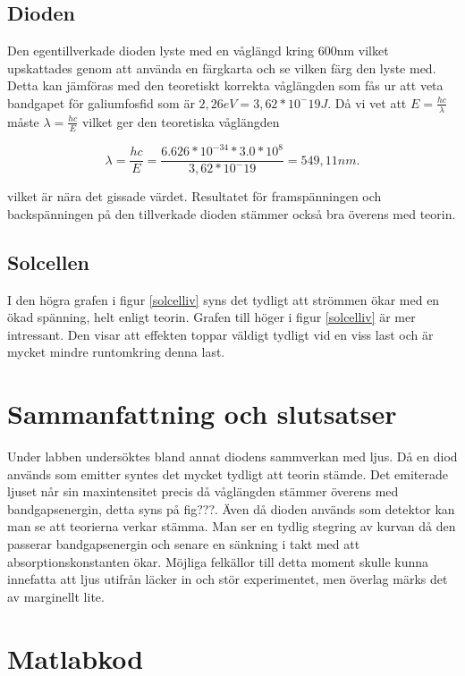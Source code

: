 \documentclass[a4paper]{article}
\begin{document}
\subsection{Dioden}
Den egentillverkade dioden lyste med en våglängd kring 600nm vilket upskattades genom att använda en färgkarta och se vilken färg den lyste med. Detta kan jämföras med den teoretiskt korrekta våglängden som fås ur att veta bandgapet för galiumfosfid som är $2,26eV = 3,62*10^-19J$. Då vi vet att $E = \frac{hc}{\lambda}$ måste $\lambda = \frac{hc}{E}$ vilket ger den teoretiska våglängden

\begin{equation}
	\lambda = \frac{hc}{E} = \frac{6.626*10^{-34} * 3.0*10^8}{3,62*10^-19} = 549,11 nm.
\end{equation}

vilket är nära det gissade värdet. Resultatet för framspänningen och backspänningen på den tillverkade dioden stämmer också bra överens med teorin.

\subsection{Solcellen}
I den högra grafen i figur \ref{solcelliv} syns det tydligt att strömmen ökar med en ökad spänning, helt enligt teorin. Grafen till höger i figur \ref{solcelliv} är mer intressant. Den visar att effekten toppar väldigt tydligt vid en viss last och är mycket mindre runtomkring denna last.


\section{Sammanfattning och slutsatser}
Under labben undersöktes bland annat diodens sammverkan med ljus. Då en diod används som emitter syntes det mycket tydligt att teorin stämde. Det emiterade ljuset når sin maxintensitet precis då våglängden stämmer överens med bandgapsenergin, detta syns på fig???. Även då dioden används som detektor kan man se att teorierna verkar stämma. Man ser en tydlig stegring av kurvan då den passerar bandgapsenergin och senare en sänkning i takt med att absorptionskonstanten ökar. Möjliga felkällor till detta moment skulle kunna innefatta att ljus utifrån läcker in och stör experimentet, men överlag märks det av marginellt lite. 

\newpage
\appendix
\section{Matlabkod}
\end{document}
